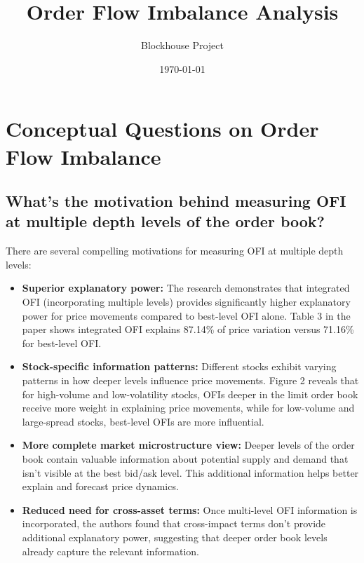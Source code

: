 \documentclass{article}
\title{Order Flow Imbalance Analysis}
\author{Blockhouse Project}
\date{\today}
\begin{document}
\maketitle

\section{Conceptual Questions on Order Flow Imbalance}

\subsection{What's the motivation behind measuring OFI at multiple depth levels of the order book?}

There are several compelling motivations for measuring OFI at multiple depth levels:

\begin{itemize}
    \item \textbf{Superior explanatory power:} The research demonstrates that integrated OFI (incorporating multiple levels) provides significantly higher explanatory power for price movements compared to best-level OFI alone. Table 3 in the paper shows integrated OFI explains 87.14\% of price variation versus 71.16\% for best-level OFI.
    
    \item \textbf{Stock-specific information patterns:} Different stocks exhibit varying patterns in how deeper levels influence price movements. Figure 2 reveals that for high-volume and low-volatility stocks, OFIs deeper in the limit order book receive more weight in explaining price movements, while for low-volume and large-spread stocks, best-level OFIs are more influential.
    
    \item \textbf{More complete market microstructure view:} Deeper levels of the order book contain valuable information about potential supply and demand that isn't visible at the best bid/ask level. This additional information helps better explain and forecast price dynamics.
    
    \item \textbf{Reduced need for cross-asset terms:} Once multi-level OFI information is incorporated, the authors found that cross-impact terms don't provide additional explanatory power, suggesting that deeper order book levels already capture the relevant information.
\end{itemize}
\end{document}
